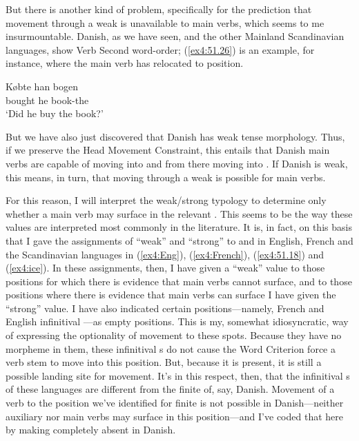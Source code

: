 But there is another kind of problem, specifically for the prediction that movement through a weak  is unavailable to main verbs,  which seems to me insurmountable. Danish, as we have seen, and the other Mainland Scandinavian languages, show Verb Second word-order; (\ref{ex4:51.26}) is an example, for instance, where the main verb has relocated to  position.
\begin{exe}
	\ex \label{ex4:51.26} \gll K\o bte han bogen\\ bought he book-the\\ `Did he buy the book?'
\end{exe}
But we have also just discovered that Danish has weak tense morphology. Thus, if we preserve the Head Movement Constraint, this entails that Danish main verbs are capable of moving into  and from there moving into . If Danish  is weak, this means, in turn, that moving through a weak  is possible for main verbs.

For this reason, I will interpret the weak/strong typology to determine only whether a main verb may surface in the relevant . This seems to be the way these values are interpreted most commonly in the literature. It is, in fact, on this basis that I gave the assignments of ``weak'' and ``strong'' to  and  in English, French and the Scandinavian languages in (\ref{ex4:Eng}), (\ref{ex4:French}), (\ref{ex4:51.18}) and (\ref{ex4:ice}). In these assignments, then, I have given a ``weak'' value to those  positions for which there is evidence that main verbs cannot surface, and to those  positions where there is evidence that main verbs can surface I have given the ``strong'' value. I have also indicated certain positions---namely, French and English infinitival ---as empty positions. This is my, somewhat idiosyncratic, way of expressing the optionality of movement to these spots. Because they have no morpheme in them, these infinitival s do not cause the Word Criterion force a verb stem to move into this position. But, because it is present, it is still a possible landing site for  movement. It's in this respect, then, that the infinitival s of these languages are different from the finite  of, say, Danish. Movement of a verb to the position we've identified for finite  is not possible in Danish---neither auxiliary nor main verbs may surface in this position---and I've coded that here by making  completely absent in Danish.

